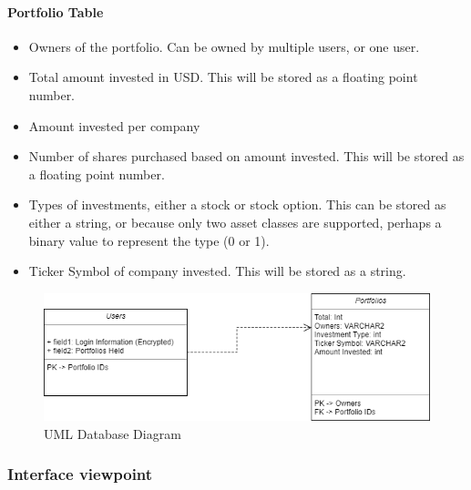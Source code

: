 \documentclass[onecolumn, draftclsnofoot,10pt, compsoc]{IEEEtran}
\begin{document}
\paragraph{Portfolio Table}
\begin{itemize}
    \item Owners of the portfolio. Can be owned by multiple users, or one user.
    \item Total amount invested in USD. This will be stored as a floating point number.
    \item Amount invested per company
    \item Number of shares purchased based on amount invested. This will be stored as a floating point number.
    \item Types of investments, either a stock or stock option. This can be stored as either a string, or because only two asset classes are supported, perhaps a binary value to represent the type (0 or 1).
    \item Ticker Symbol of company invested. This will be stored as a string.

\end{itemize}

\begin{figure}[h]
\centering
\captionsetup{justification=centering}
\includegraphics[width=14cm]{design/database.png}
\caption{UML Database Diagram}
\end{figure}


\subsubsection{Interface viewpoint}
\end{document}

